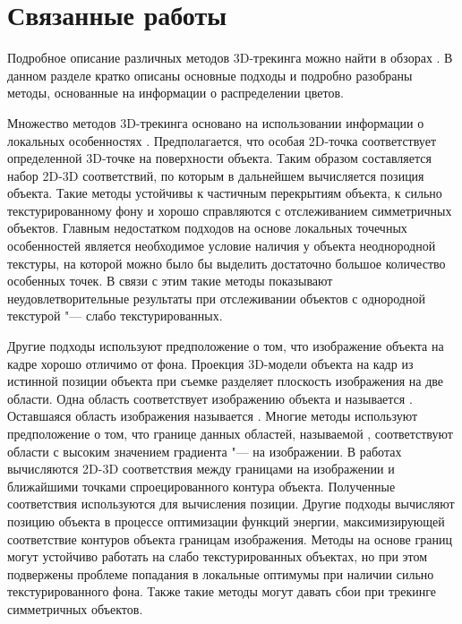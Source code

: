 \section{Связанные работы}\label{related-work}

Подробное описание различных методов 3D-трекинга можно найти в обзорах
\cite{LepetitSurvey,MarchandSurvey}.
В данном разделе кратко описаны основные подходы и подробно разобраны методы,
основанные на информации о распределении цветов.

Множество методов 3D-трекинга
\cite{Hinterstoisser2007,Vacchetti2004,Lourakis2013,Pauwels2013}
основано на использовании информации о локальных
особенностях \cite{AKAZE,SIFT,ShiAndTomasi,TomasiAndKanade,SIFT,PyrLK}.
Предполагается, что особая 2D-точка соответствует определенной
3D-точке на поверхности объекта.
Таким образом составляется набор 2D-3D соответствий, по которым в дальнейшем
вычисляется позиция объекта\cite{EPnP}.
Такие методы устойчивы к частичным перекрытиям объекта, к сильно
текстурированному фону и хорошо справляются с отслеживанием симметричных
объектов.
Главным недостатком подходов на основе локальных точечных особенностей является
необходимое условие наличия у объекта неоднородной текстуры, на которой можно
было бы выделить достаточно большое количество особенных точек.
В связи с этим такие методы показывают неудовлетворительные результаты при
отслеживании объектов с однородной текстурой "--- слабо текстурированных.

Другие подходы используют предположение о том, что изображение объекта на кадре
хорошо отличимо от фона.
Проекция 3D-модели объекта на кадр из истинной позиции объекта при съемке
разделяет плоскость изображения на две области.
Одна область соответствует изображению объекта и называется .
Оставшаяся область изображения называется .
Многие методы используют предположение о том, что границе данных областей,
называемой , соответствуют области с высоким значением
градиента "---  на изображении\cite{EdgesSurvey,CANNY}.
В работах
\cite{RAPID,Marchand2003,Choi2012,Marchand2006,Klein2006,SeoHinterstoisser2014,WangZhong2015,Damen2012,VacchettiEdges2004}
вычисляются 2D-3D соответствия между границами на изображении и ближайшими
точками спроецированного контура объекта.
Полученные соответствия используются для вычисления позиции.
Другие подходы \cite{WangZhong2017,Marchand2001,Bugaev_2018_ECCV} вычисляют
позицию объекта в процессе оптимизации функций энергии, максимизирующей
соответствие контуров объекта границам изображения.
Методы на основе границ могут устойчиво работать на слабо текстурированных
объектах, но при этом подвержены проблеме попадания в локальные оптимумы
при наличии сильно текстурированного фона.
Также такие методы могут давать сбои при трекинге симметричных объектов.

